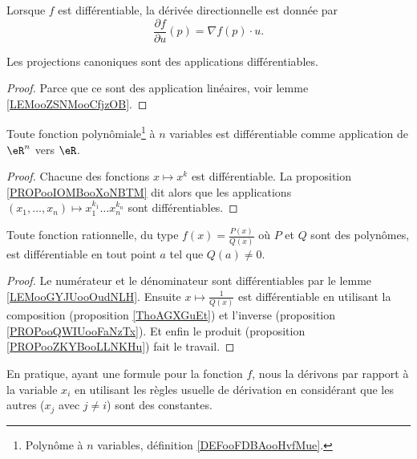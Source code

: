 Lorsque \( f\) est différentiable, la dérivée directionnelle est donnée par
\begin{equation}        \label{EqDerDirnablau}
	\frac{ \partial f }{ \partial u }(p)=\nabla f(p)\cdot u.
\end{equation}


\begin{lemma}       \label{LEMooASGNooCWqAmN}
	Les projections canoniques sont des applications différentiables.
\end{lemma}

\begin{proof}
	Parce que ce sont des application linéaires, voir lemme \ref{LEMooZSNMooCfjzOB}.
\end{proof}

\begin{lemma}       \label{LEMooGYJUooOudNLH}
	Toute fonction polynômiale\footnote{Polynôme à \( n\) variables, définition \ref{DEFooFDBAooHvfMue}.} à \( n\) variables est différentiable comme application de \( \eR^n\) vers \( \eR\).
\end{lemma}

\begin{proof}
	Chacune des fonctions \( x\mapsto x^k\) est différentiable. La proposition \ref{PROPooIOMBooXoNBTM} dit alors que les applications \( (x_1,\ldots,x_n)\mapsto x_1^{k_1}\ldots x_n^{k_n}\) sont différentiables.
\end{proof}



\begin{lemma}       \label{LEMooUMRXooDUQHpK}
	Toute fonction rationnelle, du type \( f(x) = \frac{P(x)}{Q(x)}\) où \( P\) et \( Q\) sont des polynômes, est différentiable en tout point \( a\) tel que \( Q(a) \neq 0\).
\end{lemma}

\begin{proof}
	Le numérateur et le dénominateur sont différentiables par le lemme \ref{LEMooGYJUooOudNLH}. Ensuite \( x\mapsto\frac{1}{ Q(x)}\) est différentiable en utilisant la composition (proposition \ref{ThoAGXGuEt}) et l'inverse (proposition \ref{PROPooQWIUooFaNzTx}). Et enfin le produit (proposition \ref{PROPooZKYBooLLNKHu}) fait le travail.
\end{proof}



\begin{normaltext} \label{deriveepartielles}
	En pratique, ayant une formule pour la fonction \( f\), nous la dérivons par rapport à la variable \( x_i\) en utilisant les règles usuelle de dérivation en considérant que les autres (\( x_j\) avec \( j \neq i\)) sont des constantes.
\end{normaltext}


